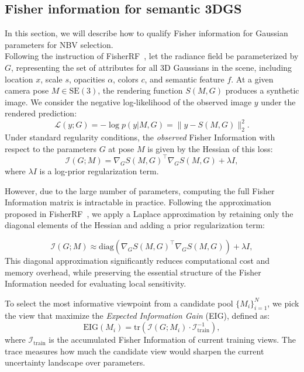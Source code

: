 \subsection{Fisher information for semantic 3DGS}
In this section, we will describe how to qualify Fisher information for Gaussian parameters for NBV selection.\\
Following the instruction of FisherRF~\cite{fisherrf}, let the radiance field be parameterized by \( G \), representing the set of attributes for all 3D Gaussians in the scene, including location \( x \), scale \( s \), opacities \( \alpha \), colors \( c \), and semantic feature \( f \). At a given camera pose \( M \in \text{SE}(3) \), the rendering function \( S(M, G) \) produces a synthetic image. We consider the negative log-likelihood of the observed image \( y \) under the rendered prediction:
\begin{equation}
\mathcal{L}(y; G) = -\log p(y | M,G) = \| y -  S(M, G) \|^2_2.
\end{equation} 
Under standard regularity conditions, the \emph{observed} Fisher Information with respect to the parameters \( G \) at pose \( M \) is given by the Hessian of this loss:
\begin{equation}
\mathcal{I}(G; M) = \nabla_G  S(M, G)^\top \nabla_G  S(M, G) + \lambda I,
\label{eq:fisherreg}
\end{equation}
where \( \lambda I \) is a log-prior regularization term.

However, due to the large number of parameters, computing the full Fisher Information matrix is intractable in practice. Following the approximation proposed in FisherRF~\cite{fisherrf}, we apply a Laplace approximation by retaining only the diagonal elements of the Hessian and adding a prior regularization term:

\begin{equation}
\mathcal{I}(G; M) \approx \text{diag}\left( \nabla_G S(M, G)^\top \nabla_G S(M, G) \right) + \lambda I,
\end{equation}
 This diagonal approximation significantly reduces computational cost and memory overhead, while preserving the essential structure of the Fisher Information needed for evaluating local sensitivity.


To select the most informative viewpoint from a candidate pool \( \{M_i\}_{i=1}^N \), we pick the view that maximize the \emph{Expected Information Gain} (EIG), defined as:
\begin{equation}
\text{EIG}(M_i) = \mathrm{tr}\left( \mathcal{I}(G; M_i) \cdot \mathcal{I}_{\text{train}}^{-1} \right),
\end{equation}
where \( \mathcal{I}_{\text{train}} \) is the accumulated Fisher Information of current training views. The trace measures how much the candidate view would sharpen the current uncertainty landscape over parameters.

